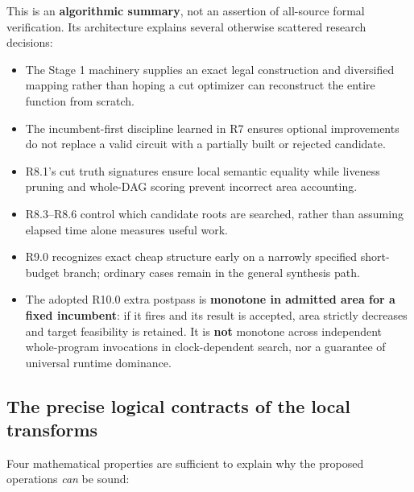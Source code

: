 This is an \textbf{algorithmic summary}, not an assertion of all-source formal verification. Its architecture explains several otherwise scattered research decisions:

\begin{itemize}
\tightlist
\item
  The Stage 1 machinery supplies an exact legal construction and diversified mapping rather than hoping a cut optimizer can reconstruct the entire function from scratch.
\item
  The incumbent-first discipline learned in R7 ensures optional improvements do not replace a valid circuit with a partially built or rejected candidate.
\item
  R8.1's cut truth signatures ensure local semantic equality while liveness pruning and whole-DAG scoring prevent incorrect area accounting.
\item
  R8.3--R8.6 control which candidate roots are searched, rather than assuming elapsed time alone measures useful work.
\item
  R9.0 recognizes exact cheap structure early on a narrowly specified short-budget branch; ordinary cases remain in the general synthesis path.
\item
  The adopted R10.0 extra postpass is \textbf{monotone in admitted area for a fixed incumbent}: if it fires and its result is accepted, area strictly decreases and target feasibility is retained. It is \textbf{not} monotone across independent whole-program invocations in clock-dependent search, nor a guarantee of universal runtime dominance.
\end{itemize}

\subsection{The precise logical contracts of the local transforms}\label{the-precise-logical-contracts-of-the-local-transforms}

Four mathematical properties are sufficient to explain why the proposed operations \emph{can} be sound:

